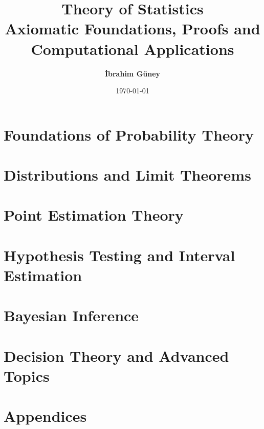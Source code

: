 \documentclass[11pt,a4paper,oneside]{book}
\title{\textbf{\Huge Theory of Statistics}\\[4pt] \Large Axiomatic Foundations, Proofs and Computational Applications}
\author{\textbf{İbrahim Güney}}
\date{\today}
\theoremstyle{definition}
\theoremstyle{plain}
\theoremstyle{remark}
\begin{document}
\frontcover
\frontmatter
\titlepg

\tableofcontents

\mainmatter
\part{Foundations of Probability Theory}




\part{Distributions and Limit Theorems}




\part{Point Estimation Theory}







\part{Hypothesis Testing and Interval Estimation}







\part{Bayesian Inference}


\part{Decision Theory and Advanced Topics}





\appendix
\part{Appendices}



\backmatter

\printindex
\backcover
\end{document}
